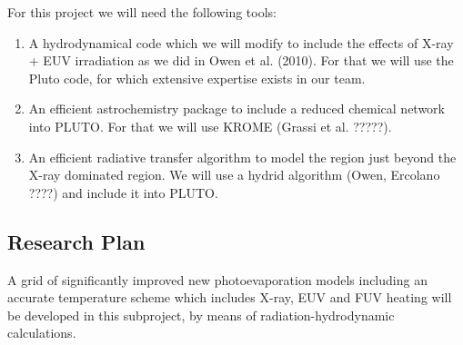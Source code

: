 \documentclass[10pt,fleqn,twoside]{article}
\begin{document}
For this project we will need the following tools: 
\begin{enumerate}
\item A hydrodynamical code which we will modify to include the
  effects of X-ray + EUV irradiation as we did in Owen et al. (2010). For
  that we will use the Pluto code, for which extensive expertise
  exists in our team. 
\item An efficient astrochemistry package to include a reduced
  chemical network into PLUTO. For that we will use KROME (Grassi et
  al. ?????). 
\item An efficient radiative transfer algorithm to model the region
  just beyond the X-ray dominated region. We will use a hydrid
  algorithm (Owen, Ercolano ????) and include it into PLUTO. 

\end{enumerate}

\subsection{Research Plan} 


A grid of significantly improved new photoevaporation models including
an accurate temperature scheme which includes X-ray, EUV and FUV
heating will be developed in this subproject, by means of
radiation-hydrodynamic calculations. 
\end{document}

